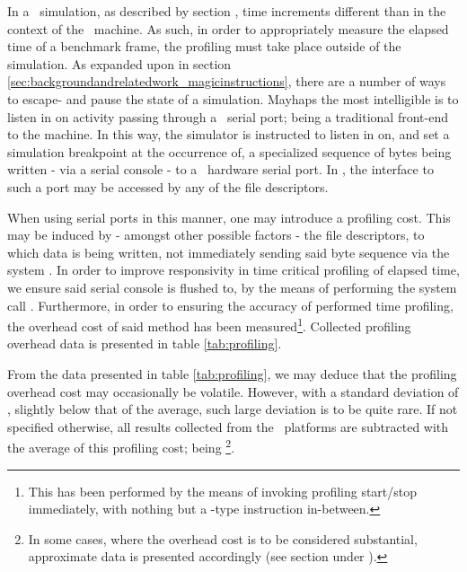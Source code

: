 In a \dvttermsimics\ simulation, as described by section , time increments different than in the context of the \dvttermhost\ machine.
As such, in order to appropriately measure the elapsed time of a benchmark frame, the profiling must take place outside of the simulation.
As expanded upon in section \ref{sec:backgroundandrelatedwork_magicinstructions}, there are a number of ways to escape- and pause the state of a simulation.
Mayhaps the most intelligible is to listen in on activity passing through a \dvttermtarget\ serial port; being a traditional front-end to the machine.
In this way, the simulator is instructed to listen in on, and set a simulation breakpoint at the occurrence of, a specialized sequence of bytes being written - via a serial console - to a \dvttermuart\ hardware serial port.
In \dvttermlinux , the interface to such a port may be accessed by any of the  file descriptors.


When using serial ports in this manner, one may introduce a profiling cost.
This may be induced by - amongst other possible factors - the file descriptors, to which data is being written, not immediately sending said byte sequence via the system \dvttermuart .
In order to improve responsivity in time critical profiling of elapsed time, we ensure said serial console is flushed to, by the means of performing the system call .
Furthermore, in order to ensuring the accuracy of performed time profiling, the overhead cost of said method has been measured\footnote{This has been performed by the means of invoking profiling start/stop immediately, with nothing but a -type instruction in-between.}.
Collected profiling overhead data is presented in table \ref{tab:profiling}.



From the data presented in table \ref{tab:profiling}, we may deduce that the profiling overhead cost may occasionally be volatile.
However, with a standard deviation of , slightly below that of the average, such large deviation is to be quite rare.
If not specified otherwise, all results collected from the \dvttermsimics\ platforms are subtracted with the average of this profiling cost; being \footnote{In some cases, where the overhead cost is to be considered substantial, approximate data is presented accordingly (see section  under ).}.\\

